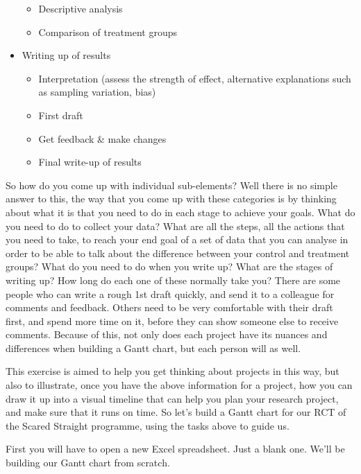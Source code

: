\documentclass[
]{book}
\providecommand{\tightlist}{%
  \setlength{\itemsep}{0pt}\setlength{\parskip}{0pt}}
\begin{document}
\begin{itemize}
  \begin{itemize}
  \tightlist
  \item
    Descriptive analysis
  \item
    Comparison of treatment groups
  \end{itemize}
\item
  Writing up of results

  \begin{itemize}
  \tightlist
  \item
    Interpretation (assess the strength of effect, alternative explanations such as sampling variation, bias)
  \item
    First draft
  \item
    Get feedback \& make changes
  \item
    Final write-up of results
  \end{itemize}
\end{itemize}

So how do you come up with individual sub-elements? Well there is no simple answer to this, the way that you come up with these categories is by thinking about what it is that you need to do in each stage to achieve your goals. What do you need to do to collect your data? What are all the steps, all the actions that you need to take, to reach your end goal of a set of data that you can analyse in order to be able to talk about the difference between your control and treatment groups? What do you need to do when you write up? What are the stages of writing up? How long do each one of these normally take you? There are some people who can write a rough 1st draft quickly, and send it to a colleague for comments and feedback. Others need to be very comfortable with their draft first, and spend more time on it, before they can show someone else to receive comments. Because of this, not only does each project have its nuances and differences when building a Gantt chart, but each person will as well.

This exercise is aimed to help you get thinking about projects in this way, but also to illustrate, once you have the above information for a project, how you can draw it up into a visual timeline that can help you plan your research project, and make sure that it runs on time. So let's build a Gantt chart for our RCT of the Scared Straight programme, using the tasks above to guide us.

First you will have to open a new Excel spreadsheet. Just a blank one. We'll be building our Gantt chart from scratch.
\end{document}
